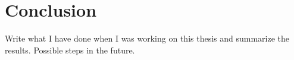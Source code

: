 \chapter{Conclusion}\label{ch:conclusion}
Write what I have done when I was working on this thesis and summarize the results.
Possible steps in the future.